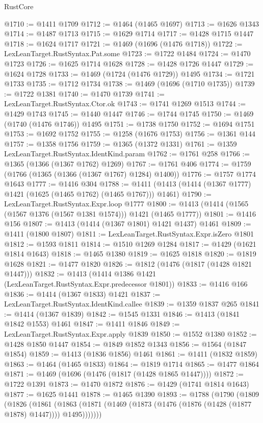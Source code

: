 \begin{lexlean}{RustCore}
\begin{coremodule}
@1710 := @1411 @1709
@1712 := @1464 (@1465 @1697)
@1713 := @1626 @1343
@1714 := @1487 @1713
@1715 := @1629 @1714
@1717 := @1428 @1715 @1447
@1718 := @1624 @1717
@1721 := @1469 (@1696 (@1476 @1718))
@1722 := LexLeanTarget.RustSyntax.Pat.some
@1723 := @1722 @1484
@1724 := @1470 @1723
@1726 := @1625 @1714 @1628
@1728 := @1428 @1726 @1447
@1729 := @1624 @1728
@1733 := @1469 (@1724 (@1476 @1729)) @1495
@1734 := @1721 @1733
@1735 := @1712 @1734
@1738 := @1469 (@1696 (@1710 @1735))
@1739 := @1722 @1381
@1740 := @1470 @1739
@1741 := LexLeanTarget.RustSyntax.Ctor.ok
@1743 := @1741 @1269 @1513
@1744 := @1429 @1743
@1745 := @1440 @1447
@1746 := @1744 @1745
@1750 := @1469 (@1740 (@1476 @1746)) @1495
@1751 := @1738 @1750
@1752 := @1694 @1751
@1753 := @1692 @1752
@1755 := @1258 (@1676 @1753)
@1756 := @1361 @144
@1757 := @1358 @1756
@1759 := @1365 (@1372 @1331)
@1761 := @1359 LexLeanTarget.RustSyntax.IdentKind.param
@1762 := @1761 @258
@1766 := @1365 (@1366 (@1367 @1762) @1269)
@1767 := @1761 @406
@1774 := @1759 (@1766 (@1365 (@1366 (@1367 @1767) @1284) @1400))
@1776 := @1757 @1774 @1643
@1777 := @1416 @304
@1788 := @1411 (@1413 (@1414 (@1367 @1777) @1421 (@1625 (@1465 @1762) (@1465 @1767))) @1461)
@1790 := LexLeanTarget.RustSyntax.Expr.loop @1777
@1800 := @1413 (@1414 (@1565 (@1567 @1376 (@1567 @1381 @1574))) @1421 (@1465 @1777))
@1801 := @1416 @156
@1807 := @1413 (@1414 (@1367 @1801) @1421 @1437) @1461
@1809 := @1411 (@1800 @1807)
@1811 := LexLeanTarget.RustSyntax.Expr.isZero @1801
@1812 := @1593 @1811
@1814 := @1510 @1269 @1284
@1817 := @1429 (@1621 @1814 @1643)
@1818 := @1465 @1380
@1819 := @1625 @1818
@1820 := @1819 @1628
@1821 := @1477 @1820
@1826 := @1812 (@1476 (@1817 (@1428 @1821 @1447)))
@1832 := @1413 (@1414 @1386 @1421 (LexLeanTarget.RustSyntax.Expr.predecessor @1801))
@1833 := @1416 @166
@1836 := @1414 (@1367 @1833) @1421
@1837 := LexLeanTarget.RustSyntax.IdentKind.callee
@1839 := @1359 @1837 @265
@1841 := @1414 (@1367 @1839)
@1842 := @1545 @1331
@1846 := @1413 (@1841 @1842 @1553) @1461
@1847 := @1411 @1846
@1849 := LexLeanTarget.RustSyntax.Expr.apply @1839
@1850 := @1552 @1380
@1852 := @1428 @1850 @1447
@1854 := @1849 @1852 @1343
@1856 := @1564 (@1847 @1854)
@1859 := @1413 (@1836 @1856) @1461
@1861 := @1411 (@1832 @1859)
@1863 := @1464 (@1465 @1833)
@1864 := @1819 @1714
@1865 := @1477 @1864
@1871 := @1469 (@1696 (@1476 (@1817 (@1428 @1865 @1447))))
@1872 := @1722 @1391
@1873 := @1470 @1872
@1876 := @1429 (@1741 @1814 @1643)
@1877 := @1625 @1441
@1878 := @1465 @1390
@1893 := @1788
    (@1790
      (@1809
        (@1826
          (@1861
            (@1863 (@1871 (@1469 (@1873 (@1476 (@1876 (@1428 (@1877 @1878) @1447)))) @1495)))))))

\end{coremodule}
\end{lexlean}
